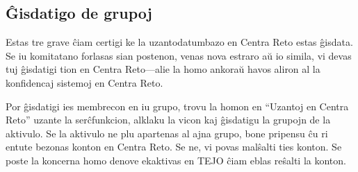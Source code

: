 \subsection{Ĝisdatigo de grupoj}
Estas tre grave ĉiam certigi ke la uzantodatumbazo en Centra Reto estas ĝisdata. Se iu komitatano forlasas sian postenon, venas nova estraro aŭ io simila, vi devas tuj ĝisdatigi tion en Centra Reto---alie la homo ankoraŭ havos aliron al la konfidencaj sistemoj en Centra Reto.

Por ĝisdatigi ies membrecon en iu grupo, trovu la homon en ``Uzantoj en Centra Reto'' uzante la serĉfunkcion, alklaku la vicon kaj ĝisdatigu la grupojn de la aktivulo. Se la aktivulo ne plu apartenas al ajna grupo, bone pripensu ĉu ri entute bezonas konton en Centra Reto. Se ne, vi povas malŝalti ties konton. Se poste la koncerna homo denove ekaktivas en TEJO ĉiam eblas reŝalti la konton.
